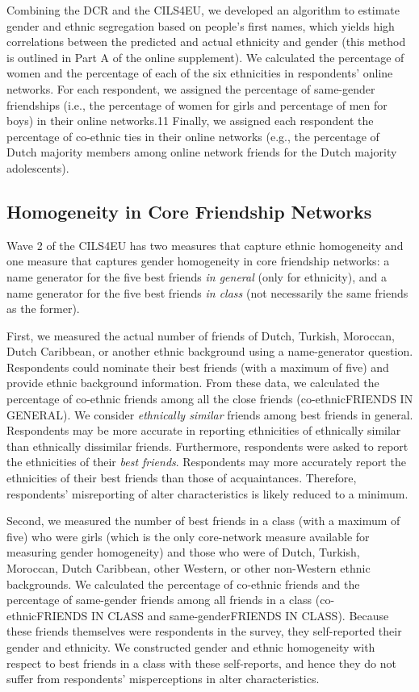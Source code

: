 \documentclass[letterpaper]{article} %
\begin{document}
Combining the DCR and the CILS4EU, we developed an algorithm to estimate gender and ethnic segregation based on people’s first names, which yields high correlations between the predicted and actual ethnicity and gender (this method is outlined in Part A of the online supplement). We calculated the percentage of women and the percentage of each of the six ethnicities in respondents’ online networks. For each respondent, we assigned the percentage of same-gender friendships (i.e., the percentage of women for girls and percentage
of men for boys) in their online networks.11
Finally, we assigned each respondent the percentage
of co-ethnic ties in their online networks
(e.g., the percentage of Dutch majority members among online network friends for the Dutch majority adolescents).

\subsection{Homogeneity in Core Friendship Networks}
Wave 2 of the CILS4EU has two measures that capture ethnic homogeneity and one measure that captures gender homogeneity in core friendship networks: a name generator for the five best friends \emph{in general} (only for ethnicity), and a name generator for the five best friends \emph{in class} (not necessarily the same friends as the former).

First, we measured the actual number of friends of Dutch, Turkish, Moroccan, Dutch Caribbean, or another ethnic background using a name-generator question. Respondents could nominate their best friends (with a maximum of five) and provide ethnic background information. From these data, we calculated the percentage of co-ethnic friends among all the close friends (co-ethnicFRIENDS IN GENERAL). We consider \emph{ethnically similar} friends among best friends in general. Respondents may be more accurate in reporting ethnicities of ethnically similar than ethnically dissimilar friends. Furthermore, respondents were asked to report the ethnicities of their \emph{best friends}. Respondents may more accurately report the ethnicities of their best friends than those of acquaintances. Therefore, respondents’ misreporting of alter characteristics is likely reduced to a minimum.

Second, we measured the number of best friends in a class (with a maximum of five) who were girls (which is the only core-network measure available for measuring gender homogeneity) and those who were of Dutch, Turkish, Moroccan, Dutch Caribbean, other Western, or other non-Western ethnic backgrounds. We calculated the percentage of co-ethnic friends and the percentage of same-gender friends among all friends in a class (co-ethnicFRIENDS IN CLASS and same-genderFRIENDS IN CLASS). Because these friends themselves were respondents in the survey, they self-reported their gender and ethnicity. We constructed gender and ethnic homogeneity with respect to best friends in a class with these self-reports, and hence they do not suffer from respondents’ misperceptions in alter characteristics.
		
\end{document}
